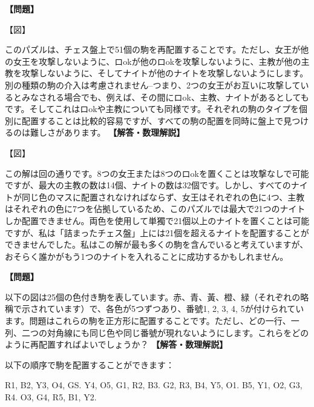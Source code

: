 \documentclass[10pt,a4paper,oneside,openany]{ltjsbook}
\begin{document}
\begin{tcolorbox}[colback=softblue,colframe=primaryblue,title=\textbf{第 306 問：詰まったチェス盤 （原題: THE CROWDED CHESSBOARD.）},arc=2mm,boxrule=1pt,breakable]
\textbf{【問題】}\par\vspace{0.3em}
【図】

このパズルは、チェス盤上で51個の駒を再配置することです。ただし、女王が他の女王を攻撃しないように、ロokが他のロokを攻撃しないように、主教が他の主教を攻撃しないように、そしてナイトが他のナイトを攻撃しないようにします。別の種類の駒の介入は考慮されません--つまり、2つの女王がお互いに攻撃しているとみなされる場合でも、例えば、その間にロok、主教、ナイトがあるとしてもです。そしてこれはロokや主教についても同様です。それぞれの駒のタイプを個別に配置することは比較的容易ですが、すべての駒の配置を同時に盤上で見つけるのは難しさがあります。
\tcblower
\textbf{【解答・数理解説】}\par\vspace{0.3em}
【図】

この解は回の通りです。8つの女王または8つのロokを置くことは攻撃なしで可能ですが、最大の主教の数は14個、ナイトの数は32個です。しかし、すべてのナイトが同じ色のマスに配置されなければならず、女王はそれぞれの色に4つ、主教はそれぞれの色に7つを佔拠しているため、このパズルでは最大で21つのナイトしか配置できません。両色を使用して単獨で21個以上のナイトを置くことは可能ですが、私は「詰まったチェス盤」上には21個を超えるナイトを配置することができませんでした。私はこの解が最も多くの駒を含んでいると考えていますが、おそらく誰かがもう1つのナイトを入れることに成功するかもしれません。
\end{tcolorbox}

\begin{tcolorbox}[colback=softblue,colframe=primaryblue,title=\textbf{第 307 問：色付きの駒 （原題: THE COLOURED COUNTERS.）},arc=2mm,boxrule=1pt,breakable]
\textbf{【問題】}\par\vspace{0.3em}
以下の図は25個の色付き駒を表しています。赤、青、黃、橙、緑（それぞれの略稱で示されています）で、各色が5つずつあり、番號1, 2, 3, 4, 5が付けられています。問題はこれらの駒を正方形に配置することです。ただし、どの一行、一列、二つの対角線にも同じ色や同じ番號が現れないようにします。これらをどのように再配置すればよいでしょうか？
\tcblower
\textbf{【解答・数理解説】}\par\vspace{0.3em}
以下の順序で駒を配置することができます：

    R1, B2, Y3, O4, GS.
    Y4, O5, G1, R2, B3.
    G2, R3, B4, Y5, O1.
    B5, Y1, O2, G3, R4.
    O3, G4, R5, B1, Y2.
\end{tcolorbox}
\end{document}
